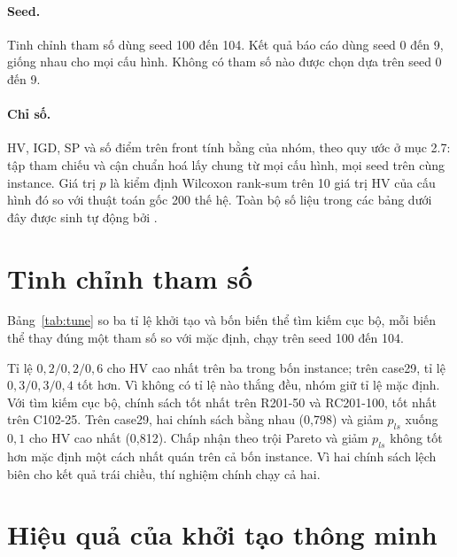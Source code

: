 \paragraph{Seed.} Tinh chỉnh tham số dùng seed 100 đến 104. Kết quả báo cáo dùng seed 0 đến 9, giống
nhau cho mọi cấu hình. Không có tham số nào được chọn dựa trên seed 0 đến 9.

\paragraph{Chỉ số.} HV, IGD, SP và số điểm trên front tính bằng  của nhóm,
theo quy ước ở mục 2.7: tập tham chiếu và cận chuẩn hoá lấy chung từ mọi cấu hình, mọi seed trên cùng
instance. Giá trị $p$ là kiểm định Wilcoxon rank-sum trên 10 giá trị HV của cấu hình đó so với thuật toán
gốc 200 thế hệ. Toàn bộ số liệu trong các bảng dưới đây được sinh tự động bởi
.

\section{Tinh chỉnh tham số}

Bảng~\ref{tab:tune} so ba tỉ lệ khởi tạo và bốn biến thể tìm kiếm cục bộ, mỗi biến thể thay đúng một
tham số so với mặc định, chạy trên seed 100 đến 104.

\begin{table}[H]
\centering
\caption{HV trung bình $\pm$ độ lệch chuẩn khi tinh chỉnh (seed 100--104; in đậm là biến thể tốt nhất
trong nhóm khởi tạo và nhóm tìm kiếm cục bộ)}
\label{tab:tune}
\resizebox{\textwidth}{!}{}
\end{table}

Tỉ lệ $0{,}2/0{,}2/0{,}6$ cho HV cao nhất trên ba trong bốn instance; trên case29, tỉ lệ $0{,}3/0{,}3/0{,}4$
tốt hơn. Vì không có tỉ lệ nào thắng đều, nhóm giữ tỉ lệ mặc định. Với tìm kiếm cục bộ, chính sách
 tốt nhất trên R201-50 và RC201-100,  tốt nhất trên C102-25. Trên
case29, hai chính sách bằng nhau (0,798) và giảm $p_{ls}$ xuống $0{,}1$ cho HV cao nhất (0,812).
Chấp nhận theo trội Pareto và giảm $p_{ls}$ không tốt hơn mặc định một cách nhất quán trên cả bốn
instance. Vì hai chính sách lệch biên cho kết quả trái chiều, thí nghiệm chính
chạy cả hai.

\section{Hiệu quả của khởi tạo thông minh}

